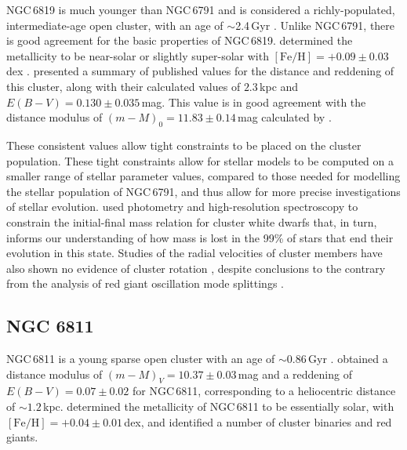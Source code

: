 NGC\,6819 is much younger than NGC\,6791 and is considered a richly-populated, intermediate-age open cluster, with an age of $\sim$2.4\,Gyr \cite[eg.][and references therein]{handberg_ngc_2017, bedin_hubble_2015, basu_sounding_2011}. Unlike NGC\,6791, there is good agreement for the basic properties of NGC\,6819. \cite{bragaglia_metal_2001} determined the metallicity to be near-solar or slightly super-solar with $[\mathrm{Fe/H}] = +0.09 \pm 0.03$\,dex \cite[see also;][]{slumstrup_ymg_2017}. \cite{ak_ccd_2016} presented a summary of published values for the distance and reddening of this cluster, along with their calculated values of $2.3$\,kpc and $E(B-V) = 0.130 \pm 0.035$\,mag. This value is in good agreement with the distance modulus of $(m-M)_0 = 11.83 \pm 0.14$\,mag calculated by \cite{wu_new_2014}.

These consistent values allow tight constraints to be placed on the cluster population. These tight constraints allow for stellar models to be computed on a smaller range of stellar parameter values, compared to those needed for modelling the stellar population of NGC\,6791, and thus allow for more precise investigations of stellar evolution. \cite{kalirai_initial-final_2008} used photometry and high-resolution spectroscopy to constrain the initial-final mass relation for cluster white dwarfs that, in turn, informs our understanding of how mass is lost in the 99\% of stars that end their evolution in this state. Studies of the radial velocities of cluster members have also shown no evidence of cluster rotation \citep{kamann_linking_2019}, despite conclusions to the contrary from the analysis of red giant oscillation mode splittings \citep{corsaro_spin_2017}.

\subsection{NGC 6811}

NGC\,6811 is a young sparse open cluster with an age of $\sim 0.86$\,Gyr \citep{janes_ngc_2013}. \cite{sandquist_age_2016} obtained a distance modulus of $(m-M)_V = 10.37 \pm 0.03$\,mag and a reddening of $E(B-V) = 0.07 \pm 0.02$ for NGC\,6811, corresponding to a heliocentric distance of $\sim 1.2$\,kpc. \cite{molenda-zakowicz_spectroscopic_2014} determined the metallicity of NGC\,6811 to be essentially solar, with $[\mathrm{Fe/H}] = +0.04 \pm 0.01$\,dex, and identified a number of cluster binaries and red giants.

